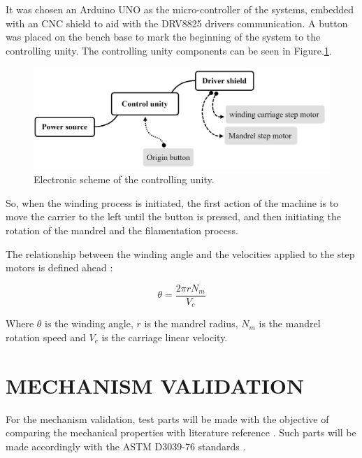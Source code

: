 \documentclass[10pt,fleqn,a4paper,twoside]{article}
\begin{document}
It was chosen an Arduino UNO as the micro-controller of the systems, embedded with an CNC shield to aid with the DRV8825 drivers communication. A button was placed on the bench base to mark the beginning of the system to the controlling unity. The controlling unity components can be seen in Figure.\ref{i6}.


\begin{figure}[!h]
	\centering
	\includegraphics[angle=0, trim = {0mm 0mm 0mm 0mm}, clip , scale=0.25]{imagens/eletronic}
	\caption{Electronic scheme of the controlling unity.}
	\label{i6}
\end{figure}

So, when the winding process is initiated, the first action of the machine is to move the carrier to the left until the button is pressed, and then initiating the rotation of the mandrel and the filamentation process.

The relationship between the winding angle and the velocities applied to the step  motors is defined ahead \citep{design_fiber}:   

\begin{equation}
\theta = \frac{2\pi r N_m}{V_c}
\end{equation}

Where $\theta$ is the winding angle, $r$ is the mandrel radius, $N_m$ is the mandrel rotation speed and $V_c$ is the carriage linear velocity.     





\section{MECHANISM VALIDATION}
For the mechanism validation, test parts will be made with the objective of comparing the mechanical properties with literature reference \citep{ensaio_artigo}. Such parts will be made accordingly with the ASTM D3039-76 standards \citep{astm}.
\end{document}
